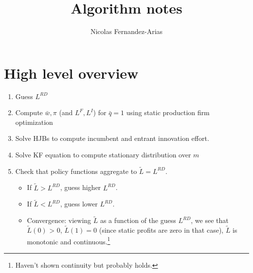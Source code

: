 \documentclass[12pt,english]{article}
\theoremstyle{remark}
\begin{document}
	
\title{Algorithm notes}
\author{Nicolas Fernandez-Arias}
\maketitle

\section{High level overview}

\begin{enumerate}
	\item Guess $L^{RD}$
	\item Compute $\bar{w},\pi$ (and $L^F,L^I$) for $\bar{q} = 1$ using static production firm optimization
	\item Solve HJBs to compute incumbent and entrant innovation effort.
	\item Solve KF equation to compute stationary distribution over $m$
	\item Check that policy functions aggregate to $\tilde{L} = L^{RD}$.
	\begin{itemize}
		\item If $\tilde{L} > L^{RD}$, guess higher $L^{RD}$. 
		\item If $\tilde{L} < L^{RD}$, guess lower $L^{RD}$.
		\item Convergence: viewing $\tilde{L}$ as a function of the guess $L^{RD}$, we see that $\tilde{L}(0)$ > 0, $\tilde{L}(1) = 0$ (since static profits are zero in that case), $\tilde{L}$ is monotonic and continuous.\footnote{Haven't shown continuity but probably holds.}
	\end{itemize}
\end{enumerate}
\end{document}
